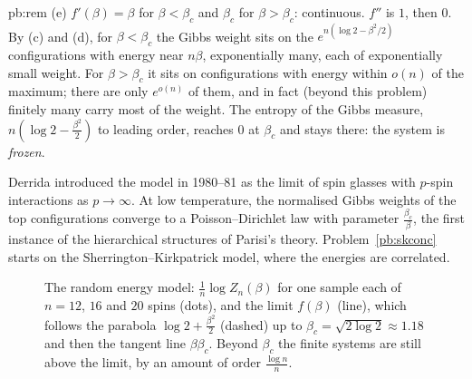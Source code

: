\begin{solution}{pb:rem}
(e) $f'(\beta)=\beta$ for $\beta<\beta_c$ and $\beta_c$ for $\beta>\beta_c$: continuous. $f''$ is $1$, then $0$. By (c) and (d), for $\beta<\beta_c$ the Gibbs weight sits on the
$e^{n(\log2-\beta^2/2)}$ configurations with energy near $n\beta$, exponentially many, each of exponentially small weight. For $\beta>\beta_c$ it sits on configurations with
energy within $o(n)$ of the maximum; there are only $e^{o(n)}$ of them, and in fact (beyond this problem) finitely many carry most of the weight. The entropy of the Gibbs
measure, $n(\log 2-\frac{\beta^2}2)$ to leading order, reaches $0$ at $\beta_c$ and stays there: the system is \emph{frozen}.

\leads Derrida introduced the model in 1980--81 as the limit of spin glasses with $p$-spin interactions as $p\to\infty$. At low temperature, the normalised Gibbs weights of the
top configurations converge to a Poisson--Dirichlet law with parameter $\frac{\beta_c}\beta$, the first instance of the hierarchical structures of Parisi's theory. Problem~\ref{pb:skconc}
starts on the Sherrington--Kirkpatrick model, where the energies are correlated.
\end{solution}

\begin{figure}[ht]
\centering{}
\caption{The random energy model: $\frac1n\log Z_n(\beta)$ for one sample each of $n=12$, $16$ and $20$ spins (dots), and the limit $f(\beta)$ (line), which follows the parabola
$\log2+\frac{\beta^2}2$ (dashed) up to $\beta_c=\sqrt{2\log2}\approx1.18$ and then the tangent line $\beta\beta_c$. Beyond $\beta_c$ the finite systems are still above the limit,
by an amount of order $\frac{\log n}n$.}
\label{fig:rem}
\end{figure}


